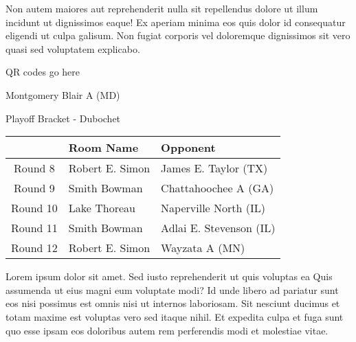 \documentclass{article}%
\begin{document}
\newline%
Non autem maiores aut reprehenderit nulla sit repellendus dolore ut illum incidunt ut dignissimos eaque! Ex aperiam minima eos quis dolor id consequatur eligendi ut culpa galisum. Non fugiat corporis vel doloremque dignissimos sit vero quasi sed voluptatem explicabo.\newline%
\newline%
%
\vspace*{30pt}%
\begin{center}%
\begin{Huge}%
QR codes go here%
\end{Huge}%
\end{center}%
\newpage%
\begin{center}%
\begin{Huge}%
Montgomery Blair A (MD)%
\end{Huge}%
\vspace*{8pt}%
\linebreak%
\begin{Large}%
Playoff Bracket {-} Dubochet%
\end{Large}%
\end{center}%
%
\begin{tabularx}{\textwidth}{|c|Y|Y|}%
\hline%
&Room Name&Opponent\\%
\hline%
Round 8&Robert E. Simon&James E. Taylor (TX)\\%
Round 9&Smith Bowman&Chattahoochee A (GA)\\%
Round 10&Lake Thoreau&Naperville North (IL)\\%
Round 11&Smith Bowman&Adlai E. Stevenson (IL)\\%
Round 12&Robert E. Simon&Wayzata A (MN)\\%
\hline%
\end{tabularx}%
\vspace*{8pt}%
\linebreak%
\newline%
\newline%
Lorem ipsum dolor sit amet. Sed iusto reprehenderit ut quis voluptas ea Quis assumenda ut eius magni eum voluptate modi? Id unde libero ad pariatur sunt eos nisi possimus est omnis nisi ut internos laboriosam. Sit nesciunt ducimus et totam maxime est voluptas vero sed itaque nihil. Et expedita culpa et fuga sunt quo esse ipsam eos doloribus autem rem perferendis modi et molestiae vitae.\newline%
\newline%
\end{document}
